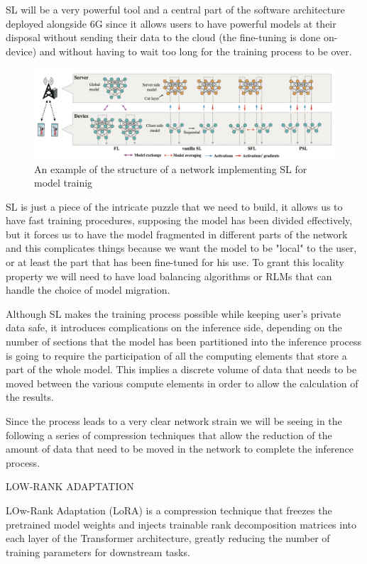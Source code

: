 SL will be a very powerful tool and a central part of the software architecture deployed alongside
6G since it allows users to have powerful models at their disposal without sending their data to the
cloud (the fine-tuning is done on-device) and without having to wait too long for the training process to be over.
\begin{figure}
	\center
	\label{img:split-learning}
	\includegraphics[scale=0.65]{figures/split-learning.png}
	\caption{An example of the structure of a network implementing SL for model trainig
		\cite{split-learning}}
\end{figure}
SL is just a piece of the intricate puzzle that we need to build, it allows us to have fast training
procedures, supposing the model has been divided effectively, but it forces us to have the model
fragmented in different parts of the network and this complicates things because we want the model
to be "local" to the user, or at least the part that has been fine-tuned for his use.
To grant this locality property we will need to have load balancing algorithms or RLMs that can
handle the choice of model migration.

Although SL makes the training process possible while keeping user's private data safe, it
introduces complications on the inference side, depending on the number of sections that the model
has been partitioned into the inference process is going to require the participation of all the
computing elements that store a part of the whole model. This implies a discrete volume of data that
needs to be moved between the various compute elements in order to allow the calculation of the
results.

Since the process leads to a very clear network strain we will be seeing in the following a series
of compression techniques that allow the reduction of the amount of data that need to be moved in
the network to complete the inference process.

\bigskip
\noindent
LOW-RANK ADAPTATION

LOw-Rank Adaptation (LoRA) is a compression technique that freezes the pretrained model weights and injects
trainable rank decomposition matrices into each layer of the Transformer architecture, greatly
reducing the number of training parameters for downstream tasks.

